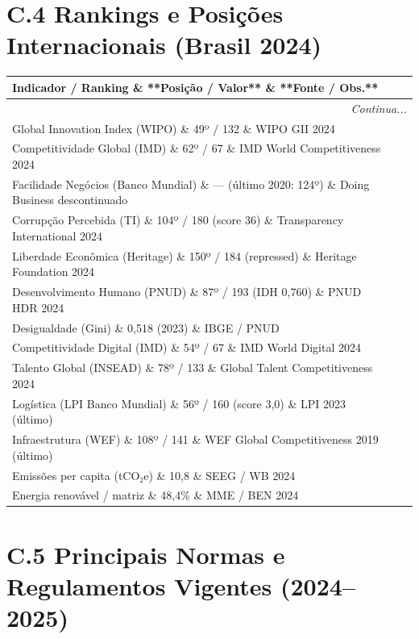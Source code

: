 \section*{C.4 Rankings e Posições Internacionais (Brasil 2024)}

\begin{longtable}{p{5cm}p{4cm}p{6cm}}
\toprule
\textbf{Indicador / Ranking} \& **Posição / Valor** \& **Fonte / Obs.**\\
\midrule
\endhead
\midrule
\multicolumn{3}{r}{\textit{Continua...}} \\
\endfoot
\bottomrule
\endlastfoot

Global Innovation Index (WIPO) \& 49º / 132 \& WIPO GII 2024\\
Competitividade Global (IMD) \& 62º / 67 \& IMD World Competitiveness 2024\\
Facilidade Negócios (Banco Mundial) \& — (último 2020: 124º) \& Doing Business descontinuado\\
Corrupção Percebida (TI) \& 104º / 180 (score 36) \& Transparency International 2024\\
Liberdade Econômica (Heritage) \& 150º / 184 (repressed) \& Heritage Foundation 2024\\
Desenvolvimento Humano (PNUD) \& 87º / 193 (IDH 0,760) \& PNUD HDR 2024\\
Desigualdade (Gini) \& 0,518 (2023) \& IBGE / PNUD\\
Competitividade Digital (IMD) \& 54º / 67 \& IMD World Digital 2024\\
Talento Global (INSEAD) \& 78º / 133 \& Global Talent Competitiveness 2024\\
Logística (LPI Banco Mundial) \& 56º / 160 (score 3,0) \& LPI 2023 (último)\\
Infraestrutura (WEF) \& 108º / 141 \& WEF Global Competitiveness 2019 (último)\\
Emissões per capita (tCO₂e) \& 10,8 \& SEEG / WB 2024\\
Energia renovável / matriz \& 48,4\% \& MME / BEN 2024 \\
\end{longtable}

\section*{C.5 Principais Normas e Regulamentos Vigentes (2024–2025)}

